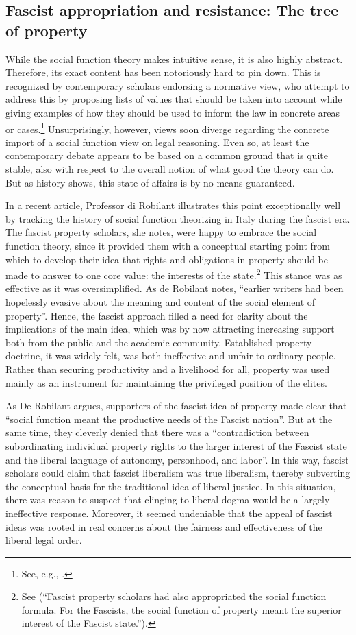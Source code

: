 \subsection{Fascist appropriation and resistance: {T}he tree of property}

While the social function theory makes intuitive sense, it is also highly abstract. Therefore, its exact content has been notoriously hard to pin down. This is recognized by contemporary scholars endorsing a normative view, who attempt to address this by proposing lists of values that should be taken into account while giving examples of how they should be used to inform the law in concrete areas or cases.\footnote{See, e.g., \cite{alexander14,alexander11,dagan07}.} Unsurprisingly, however, views soon diverge regarding the concrete import of a social function view on legal reasoning. Even so, at least the contemporary debate appears to be based on a common ground that is quite stable, also with respect to the overall notion of what good the theory can do. But as history shows, this state of affairs is by no means guaranteed. 

In a recent article, Professor di Robilant illustrates this point exceptionally well by tracking the history of social function theorizing in Italy during the fascist era. The fascist property scholars, she notes, were happy to embrace the social function theory, since it provided them with a conceptual starting point from which to develop their idea that rights and obligations in property should be made to answer to one core value: the interests of the state.\footnote{See \cite[908-909]{robilant13} (``Fascist property scholars had also appropriated the social function formula. For the Fascists, the social function of property meant the superior interest of the Fascist state.'').} This stance was as effective as it was oversimplified. As de Robilant notes, ``earlier writers had been hopelessly evasive about the meaning and content of the social element of property''. Hence, the fascist approach filled a need for clarity about the implications of the main idea, which was by now attracting increasing support both from the public and the academic community. Established property doctrine, it was widely felt, was both ineffective and unfair to ordinary people. Rather than securing productivity and a livelihood for all, property was used mainly as an instrument for maintaining the privileged position of the elites.

As De Robilant argues, supporters of the fascist idea of property made clear that ``social function meant the productive needs of the Fascist nation''. But at the same time, they cleverly denied that there was a ``contradiction between subordinating individual property rights to the larger interest of the Fascist state and the liberal language of autonomy, personhood, and labor''. In this way, fascist scholars could claim that fascist liberalism was true liberalism, thereby subverting the conceptual basis for the traditional idea of liberal justice. In this situation, there was reason to suspect that clinging to liberal dogma would be a largely ineffective response. Moreover, it seemed undeniable that the appeal of fascist ideas was rooted in real concerns about the fairness and effectiveness of the liberal legal order. 

